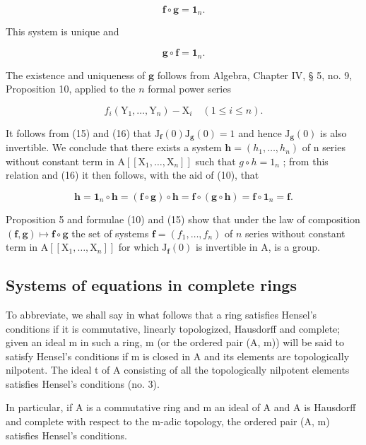 \[
\mathbf {f} \circ \mathbf {g} = \mathbf {1} _ {n}.\tag{16}
\]

This system is unique and

\[
\mathbf {g} \circ \mathbf {f} = \mathbf {1} _ {n}.\tag{17}
\]

The existence and uniqueness of \(\mathbf{g}\) follows from Algebra, Chapter IV, § 5, no. 9, Proposition 10, applied to the \(n\) formal power series

\[
f _ {i} (\mathrm{Y} _ {1}, \dots , \mathrm{Y} _ {n}) - \mathrm{X} _ {i} \quad (1 \leqslant i \leqslant n).
\]

It follows from (15) and (16) that \(\mathrm{J}_{\mathbf{f}}(0)\mathrm{J}_{\mathbf{g}}(0)=1\) and hence \(\mathrm{J}_{\mathbf{g}}(0)\) is also invertible. We conclude that there exists a system \(\mathbf{h}=(h_{1},\ldots,h_{n})\) of n series without constant term in \(\mathrm{A}[[\mathrm{X}_{1},\ldots,\mathrm{X}_{n}]]\) such that \(g\circ h=1_{n}\) ; from this relation and (16) it then follows, with the aid of (10), that

\[
\mathbf {h} = \mathbf {1} _ {n} \circ \mathbf {h} = (\mathbf {f} \circ \mathbf {g}) \circ \mathbf {h} = \mathbf {f} \circ (\mathbf {g} \circ \mathbf {h}) = \mathbf {f} \circ \mathbf {1} _ {n} = \mathbf {f}.
\]

Proposition 5 and formulae (10) and (15) show that under the law of composition \((\mathbf{f},\mathbf{g})\mapsto \mathbf{f}\circ \mathbf{g}\) the set of systems \(\mathbf{f} = (f_1,\dots ,f_n)\) of \(n\) series without constant term in \(\mathrm{A}[[\mathrm{X}_1,\dots ,\mathrm{X}_n]]\) for which \(\mathrm{J}_{\mathbf{f}}(0)\) is invertible in A, is a group.

\subsection{Systems of equations in complete rings}

To abbreviate, we shall say in what follows that a ring satisfies Hensel's conditions if it is commutative, linearly topologized, Hausdorff and complete; given an ideal m in such a ring, m (or the ordered pair (A, m)) will be said to satisfy Hensel's conditions if m is closed in A and its elements are topologically nilpotent. The ideal t of A consisting of all the topologically nilpotent elements satisfies Hensel's conditions (no. 3).

In particular, if A is a commutative ring and m an ideal of A and A is Hausdorff and complete with respect to the m-adic topology, the ordered pair (A, m) satisfies Hensel's conditions.

